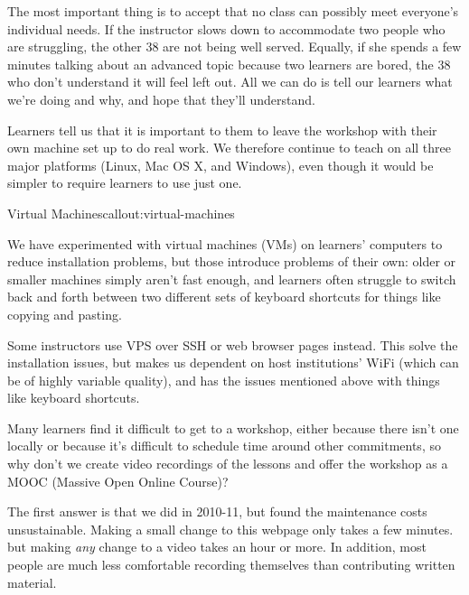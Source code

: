 The most important thing is to accept that no class can possibly meet
everyone's individual needs. If the instructor slows down to accommodate
two people who are struggling, the other 38 are not being well served.
Equally, if she spends a few minutes talking about an advanced topic
because two learners are bored, the 38 who don't understand it will feel
left out. All we can do is tell our learners what we're doing and why,
and hope that they'll understand.


Learners tell us that it is important to them to leave the workshop
with their own machine set up to do real work. We therefore continue
to teach on all three major platforms (Linux, Mac OS X, and Windows),
even though it would be simpler to require learners to use just one.


\begin{callout}{Virtual Machines}{callout:virtual-machines}

We have experimented with virtual machines (VMs) on learners'
computers to reduce installation problems, but those introduce
problems of their own: older or smaller machines simply aren't fast
enough, and learners often struggle to switch back and forth between
two different sets of keyboard shortcuts for things like copying and
pasting.

Some instructors use VPS over SSH or web browser pages instead. This
solve the installation issues, but makes us dependent on host
institutions' WiFi (which can be of highly variable quality), and has
the issues mentioned above with things like keyboard shortcuts.

\end{callout}


Many learners find it difficult to get to a workshop, either because
there isn't one locally or because it's difficult to schedule time
around other commitments, so why don't we create video recordings of
the lessons and offer the workshop as a MOOC (Massive Open Online
Course)?

The first answer is that we did in 2010-11, but found the maintenance
costs unsustainable. Making a small change to this webpage only takes
a few minutes. but making \emph{any} change to a video takes an hour
or more. In addition, most people are much less comfortable recording
themselves than contributing written material.

